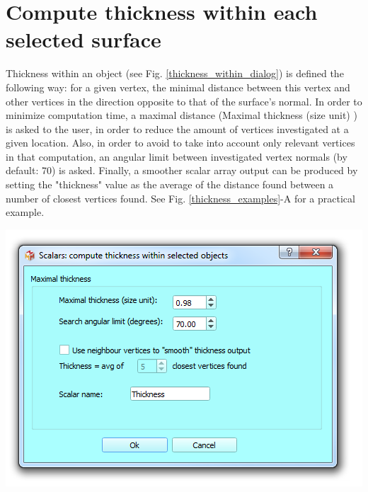 \section{Compute thickness within each selected surface}
\begin{minipage}{0.5\textwidth}
Thickness within an object (see Fig. \ref{thickness_within_dialog}) is defined the following way: for a
given vertex, the minimal distance between this vertex and other
vertices in the direction opposite to that of the surface's normal. In order to minimize computation time, a maximal
distance (Maximal thickness (size unit) ) is asked to the user, in order
to reduce the amount of vertices investigated at a given location. Also, in order to avoid to take into account only relevant vertices in that computation, an angular limit between investigated vertex normals (by default: 70\degree) is asked. Finally, a smoother scalar array output can be produced by setting the "thickness" value as the average of the distance found between a number of closest vertices found. See Fig. \ref{thickness_examples}-A for a practical example. 
 
\end{minipage}    
\begin{minipage}{0.5\textwidth}\centering
 \includegraphics[scale=0.5]{images/11/thickness_within_dialog.png}
\label{thickness_within_dialog}
 \end{minipage} 


